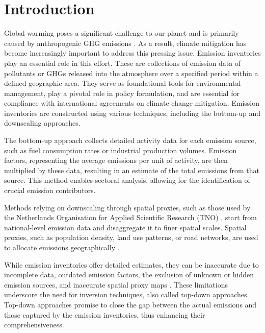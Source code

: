 
\chapter{Introduction}\label{chapter:introduction}

Global warming poses a significant challenge to our planet and is primarily caused by anthropogenic \gls{GHG} emissions \parencite{IPCC_AR6}.
As a result, climate mitigation has become increasingly important to address this pressing issue.
Emission inventories play an essential role in this effort.
These are collections of emission data of pollutants or \gls{GHG}s released into the atmosphere over a specified period within a defined geographic area.
They serve as foundational tools for environmental management, play a pivotal role in policy formulation, and are essential for compliance with international agreements on climate change mitigation.
Emission inventories are constructed using various techniques, including the bottom-up and downscaling approaches.

The bottom-up approach collects detailed activity data for each emission source, such as fuel consumption rates or industrial production volumes.
Emission factors, representing the average emissions per unit of activity, are then multiplied by these data, resulting in an estimate of the total emissions from that source.
This method enables sectoral analysis, allowing for the identification of crucial emission contributors.

Methods relying on downscaling through spatial proxies, such as those used by the Netherlands Organisation for Applied Scientific Research (TNO) \parencite{TNO_HighRes15, TNO_HighRes18}, start from national-level emission data and disaggregate it to finer spatial scales.
Spatial proxies, such as population density, land use patterns, or road networks, are used to allocate emissions geographically \parencite{SpatialProxies}.

While emission inventories offer detailed estimates, they can be inaccurate due to incomplete data, outdated emission factors, the exclusion of unknown or hidden emission sources, and inaccurate spatial proxy maps \parencite{InventoryUncertainties}.
These limitations underscore the need for inversion techniques, also called top-down approaches.
Top-down approaches promise to close the gap between the actual emissions and those captured by the emission inventories, thus enhancing their comprehensiveness.

